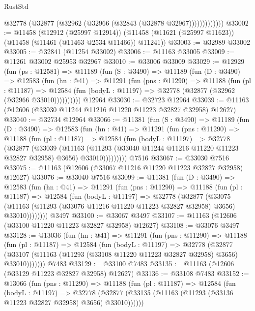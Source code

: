 \begin{lexlean}{RustStd}
\begin{coremodule}
                  @32778 (@32877 (@32962 (@32966 (@32843 (@32878 @32967)))))))))))))
@33002 := @11458
    (@12912 (@25997 @12914))
    (@11458 (@11621 (@25997 @11623)) (@11458 (@11461 (@11463 @2534 @11466)) @11241))
@33003 := @32989 @33002
@33005 := @32841 (@11254 @33002)
@33006 := @11163 @33005
@33009 := @11261 @33002 @25953 @32967
@33010 := @33006 @33009
@33029 := @12929
    (fun (ps : @12581) =>
    @11189
      (fun (S : @3490) =>
      @11189
        (fun (D : @3490) =>
        @12583
          (fun (hn : @41) =>
          @11291
            (fun (pns : @11290) =>
            @11188
              (fun (pl : @11187) =>
              @12584 (fun (bodyL : @11197) => @32778 (@32877 (@32962 (@32966 @33010))))))))))
    @12964
@33030 := @32723 @12964
@33039 := @11163 (@12606 (@33030 @11244 @11216 @11220 @11223 @32827 @32958) @12627)
@33040 := @32734 @12964
@33066 := @11381
    (fun (S : @3490) =>
    @11189
      (fun (D : @3490) =>
      @12583
        (fun (hn : @41) =>
        @11291
          (fun (pns : @11290) =>
          @11188
            (fun (pl : @11187) =>
            @12584
              (fun (bodyL : @11197) =>
              @32778
                (@32877
                  (@33039
                    (@11163
                      (@11293 (@33040 @11244 @11216 @11220 @11223 @32827 @32958) @3656)
                      @33010)))))))))
    @7516
@33067 := @33030 @7516
@33075 := @11163 (@12606 (@33067 @11216 @11220 @11223 @32827 @32958) @12627)
@33076 := @33040 @7516
@33099 := @11381
    (fun (D : @3490) =>
    @12583
      (fun (hn : @41) =>
      @11291
        (fun (pns : @11290) =>
        @11188
          (fun (pl : @11187) =>
          @12584
            (fun (bodyL : @11197) =>
            @32778
              (@32877
                (@33075
                  (@11163 (@11293 (@33076 @11216 @11220 @11223 @32827 @32958) @3656) @33010))))))))
    @3497
@33100 := @33067 @3497
@33107 := @11163 (@12606 (@33100 @11220 @11223 @32827 @32958) @12627)
@33108 := @33076 @3497
@33128 := @13036
    (fun (hn : @41) =>
    @11291
      (fun (pns : @11290) =>
      @11188
        (fun (pl : @11187) =>
        @12584
          (fun (bodyL : @11197) =>
          @32778
            (@32877
              (@33107 (@11163 (@11293 (@33108 @11220 @11223 @32827 @32958) @3656) @33010)))))))
    @7483
@33129 := @33100 @7483
@33135 := @11163 (@12606 (@33129 @11223 @32827 @32958) @12627)
@33136 := @33108 @7483
@33152 := @13066
    (fun (pns : @11290) =>
    @11188
      (fun (pl : @11187) =>
      @12584
        (fun (bodyL : @11197) =>
        @32778 (@32877 (@33135 (@11163 (@11293 (@33136 @11223 @32827 @32958) @3656) @33010))))))

\end{coremodule}
\end{lexlean}
